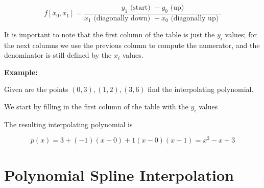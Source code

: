 \[
    f[x_0, x_1] = \frac{y_1 \text{ (start) } - y_0 \text{ (up)}}{x_1 \text{ (diagonally down) } - x_0 \text{ (diagonally up) }}
\]

It is important to note that the first column of the table is just the \(y_i\) values; for the next columns we use the previous column to compute the numerator, and the denominator is 
still defined by the \(x_i\) values.

\textbf{Example:}

Given are the points \((0, 3), (1, 2), (3, 6)\) find the interpolating polynomial.

We start by filling in the first column of the table with the \(y_i\) values

\medskip

\begin{center}
\end{center}

The resulting interpolating polynomial is

\[
    p(x) = 3 + (-1)(x - 0) + 1(x - 0)(x - 1) = x^2 - x + 3
\]

\section{Polynomial Spline Interpolation}

